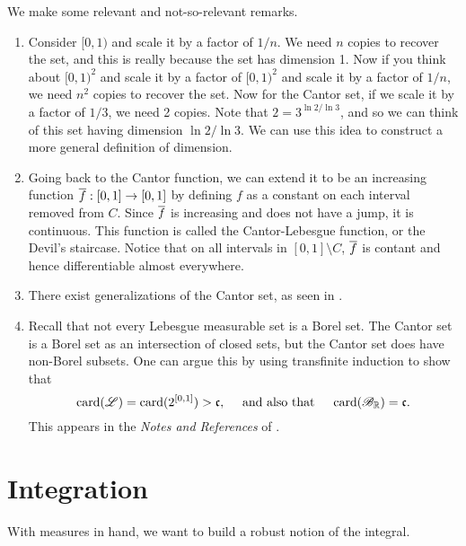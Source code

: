 \documentclass[12pt]{article} %
\begin{document}
\begin{remark}
    We make some relevant and not-so-relevant remarks.\begin{enumerate}
        \item Consider $[0,1)$ and scale it by a factor of $1/n$. We need $n$ copies to recover the set, and this is really because the set has dimension 1. Now if you think about $[0,1)^2$ and scale it by a factor of $[0,1)^2$ and scale it by a factor of $1/n$, we need $n^2$ copies to recover the set. Now for the Cantor set, if we scale it by a factor of $1/3$, we need 2 copies. Note that $2 = 3^{\ln 2 / \ln 3}$, and so we can think of this set having dimension $\ln 2 / \ln 3$. We can use this idea to construct a more general definition of dimension.
        \item Going back to the Cantor function, we can extend it to be an increasing function $\overline{f} : [0,1] \to [0,1]$ by defining $f$ as a constant on each interval removed from $C$. Since $\overline{f}$ is increasing and does not have a jump, it is continuous. This function is called the Cantor-Lebesgue function, or the Devil's staircase. Notice that on all intervals in $[0,1] \setminus C$, $\overline{f}$ is contant and hence differentiable almost everywhere. 
        \item There exist generalizations of the Cantor set, as seen in \citet[Exercise~32]{folland1999real}.
        \item Recall that not every Lebesgue measurable set is a Borel set. The Cantor set is a Borel set as an intersection of closed sets, but the Cantor set does have non-Borel subsets. One can argue this by using transfinite induction to show that \[\operatorname{card}(\mathscr{L}) = \operatorname{card}(2^{[0,1]}) > \mathfrak{c}, \ \ \ \ \text{and also that} \ \ \ \ \operatorname{card}(\mathscr{B}_{\mathbb{R}}) = \mathfrak{c}.\] This appears in the \textit{Notes and References} of \citet[Chapter~2]{folland1999real}.
    \end{enumerate}
\end{remark}

\section{Integration}

With measures in hand, we want to build a robust notion of the integral.
\end{document}
